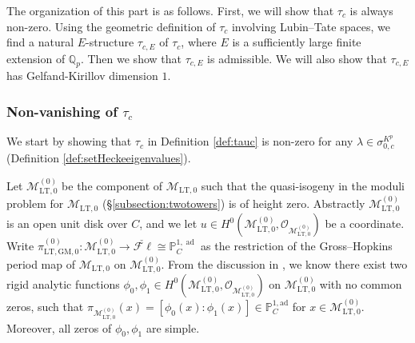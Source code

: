 \documentclass{article}
\theoremstyle{definition}
\def\calM{\mathcal{M}}
\def\calO{\mathcal{O}}
\def\bbP{\mathbb{P}}
\def\bbQ{\mathbb{Q}}
\def\isom{\cong}
\DeclareMathOperator{\ad}{ad}
\def\LT{\mathrm{LT}}
\def\fl{\mathscr{F}\ell}
\def\GM{\mathrm{GM}}
\begin{document}
The organization of this part is as follows. First, we will show that $\tau_c$ is always non-zero. Using the geometric definition of $\tau_c $ involving Lubin--Tate spaces, we find a natural $E$-structure $\tau_{c,E}$ of $\tau_c $, where $E$ is a sufficiently large finite extension of $\bbQ_p$. Then we show that $\tau_{c,E}$ is admissible. We will also show that $\tau_{c,E}$ has Gelfand-Kirillov dimension $1$.  

\subsubsection{Non-vanishing of $\tau_c $}\label{subsectionnonvanishing}
We start by showing that $\tau_c$ in Definition \ref{def:tauc} is non-zero for any $\lambda\in \sigma_{0,c}^{K^p}$ (Definition \ref{def:setHeckeeigenvalues}). 

Let $\calM_{\LT,0}^{(0)}$ be the component of $\calM_{\LT,0}$ such that the quasi-isogeny in the moduli problem for $\calM_{\LT,0}$ (\S\ref{subsection:twotowers}) is of height zero. Abstractly $\calM_{\LT,0}^{(0)}$ is an open unit disk over $C$, and we let $u\in H^0(\calM_{\LT,0}^{(0)},\calO_{\calM_{\LT,0}^{(0)}})$ be a coordinate. Write $\pi_{\LT,\GM,0}^{(0)}:\calM_{\LT,0}^{(0)}\to \check{\fl}\isom \bbP^{1,\ad}_C$ as the restriction of the Gross--Hopkins period map of $\calM_{\LT,0}$ on $\calM_{\LT,0}^{(0)}$. From the discussion in \cite[\S 25]{GH94}, we know there exist two rigid analytic functions $\phi_0,\phi_1\in H^0(\calM_{\LT,0}^{(0)},\calO_{\calM_{\LT,0}^{(0)}})$ on $\calM_{\LT,0}^{(0)}$ with no common zeros, such that $\pi_{\calM_{\LT,0}^{(0)}}(x)=[\phi_0(x):\phi_1(x)]\in\bbP^{1,\mathrm{ad}}_C$ for $x\in \calM_{\LT,0}^{(0)}$. Moreover, all zeros of $\phi_0,\phi_1$ are simple. 
\end{document}
